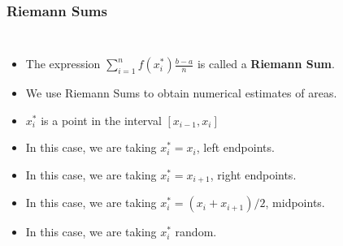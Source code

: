 \documentclass[serif,ignorenonframetext]{beamer}
\newcommand{\ds}{\displaystyle}
\begin{document}
\begin{frame}
  \frametitle{Riemann Sums}
  \begin{columns}
  \begin{itemize}[<+->]
  \item The expression $\ds \sum_{i=1}^n f(x_i^*) \frac{b-a}{n}$ is
    called a \textbf{Riemann Sum}.
  \item We use Riemann Sums to obtain numerical estimates of areas.
  \item $x_i^*$ is a point in the interval $[x_{i-1},x_{i}]$
  \item In this case, we are taking $x_i^*=x_i$, left endpoints.
  \item In this case, we are taking $x_i^*=x_{i+1}$, right endpoints.
  \item In this case, we are taking $x_i^*=(x_i+x_{i+1})/2$, midpoints.
  \item In this case, we are taking $x_i^*$ random.
  \end{itemize}

\end{columns}
\end{frame}
\end{document}
